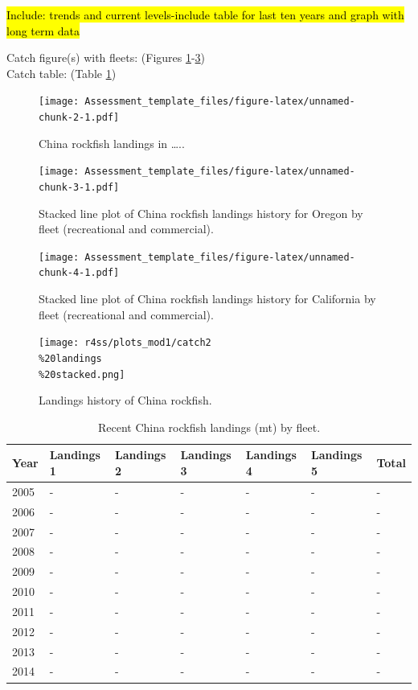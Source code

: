 \documentclass[12pt,]{article}
\begin{document}
\hl{Include: trends and current levels-include table for last ten years and graph with 
long term data}

Catch figure(s) with fleets: (Figures
\ref{fig:Exec_catch1}-\ref{fig:Exec_catch3})\\
Catch table: (Table \ref{tab:Exec_catch})

\FloatBarrier

\begin{figure}[htbp]
\centering
\texttt{[image: Assessment\_template\_files/figure-latex/unnamed-chunk-2-1.pdf]}
\caption{China rockfish landings in \ldots{}.. \label{fig:Exec_catch1}}
\end{figure}

\begin{figure}[htbp]
\centering
\texttt{[image: Assessment\_template\_files/figure-latex/unnamed-chunk-3-1.pdf]}
\caption{Stacked line plot of China rockfish landings history for Oregon
by fleet (recreational and commercial). \label{fig:Exec_catch2}}
\end{figure}

\begin{figure}[htbp]
\centering
\texttt{[image: Assessment\_template\_files/figure-latex/unnamed-chunk-4-1.pdf]}
\caption{Stacked line plot of China rockfish landings history for
California by fleet (recreational and commercial).
\label{fig:Exec_catch3}}
\end{figure}

\begin{figure}[htbp]
\centering
\texttt{[image: r4ss/plots\_mod1/catch2\\\%20landings\\\%20stacked.png]}
\caption{Landings history of China rockfish. \label{fig:r4ss_catches}}
\end{figure}

\begin{table}[ht]
\centering
\caption{Recent China rockfish landings (mt) by 
                                            fleet.} 
\label{tab:Exec_catch}
\begin{tabular}{l>{\centering}p{1in}>{\centering}p{1in}>{\centering}p{1in}>{\centering}p{.9in}>{\centering}p{.9in}>{\centering}p{.6in}}
  \hline
Year & Landings 1 & Landings 2 & Landings 3 & Landings 4 & Landings 5 & Total \\ 
  \hline
2005 & - & - & - & - & - & - \\ 
  2006 & - & - & - & - & - & - \\ 
  2007 & - & - & - & - & - & - \\ 
  2008 & - & - & - & - & - & - \\ 
  2009 & - & - & - & - & - & - \\ 
  2010 & - & - & - & - & - & - \\ 
  2011 & - & - & - & - & - & - \\ 
  2012 & - & - & - & - & - & - \\ 
  2013 & - & - & - & - & - & - \\ 
  2014 & - & - & - & - & - & - \\ 
   \hline
\end{tabular}
\end{table}
\end{document}
